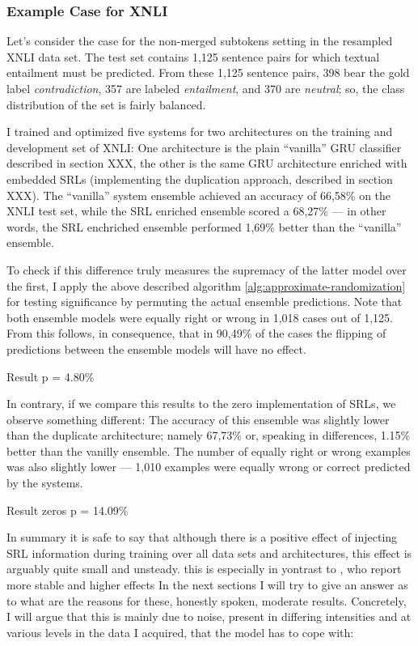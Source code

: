 \subsubsection{Example Case for XNLI}


Let's consider the case for the non-merged subtokens setting in the resampled XNLI data set. The test
set contains 1,125 sentence pairs for which textual entailment must be predicted. From these 1,125
sentence pairs, 398 bear the gold label \emph{contradiction}, 357 are labeled \emph{entailment},
and 370 are \emph{neutral}; so, the class distribution of the set is fairly balanced.

I trained and optimized five systems for two architectures on the training and development set
of XNLI: One architecture is the plain ``vanilla'' GRU classifier described in section XXX, the
other is the same GRU architecture enriched with embedded SRLs (implementing the duplication
approach, described in section XXX). The ``vanilla'' system ensemble achieved an accuracy of
66,58\% on the XNLI test set, while the SRL enriched ensemble scored a 68,27\% --- in other
words, the SRL enchriched ensemble performed 1,69\% better than the ``vanilla'' ensemble.

To check if this difference truly measures the supremacy of the latter model over the first, I
apply the above described algorithm \ref{alg:approximate-randomization} for testing significance
by permuting the actual ensemble predictions. Note that both ensemble models were equally
right or wrong in 1,018 cases out of 1,125.  From this follows, in consequence, that in 90,49\%
of the cases the flipping of predictions between the ensemble models will have no effect.

Result p = 4.80\%

In contrary, if we compare this results to the zero implementation of SRLs, we observe something
different: The accuracy of this ensemble was slightly lower than the duplicate architecture;
namely 67,73\% or, speaking in differences, 1.15\% better than the vanilly ensemble. The
number of equally right or wrong examples was also slightly lower --- 1,010 examples were
equally wrong or correct predicted by the systems.

Result zeros p = 14.09\%

In summary it is safe to say that although there is a positive effect of injecting
SRL information during training over all data sets and architectures, this effect is
arguably quite small and unsteady. {\color{red} this is especially in yontrast to
\cite{zhang2019semantics}, who report more stable and higher effects} In the next
sections I will try to give an answer as to what are the reasons for these, honestly
spoken, moderate results. Concretely, I will argue that this is mainly due to noise,
present in differing intensities and at various levels in the data I acquired, that
the model has to cope with:

